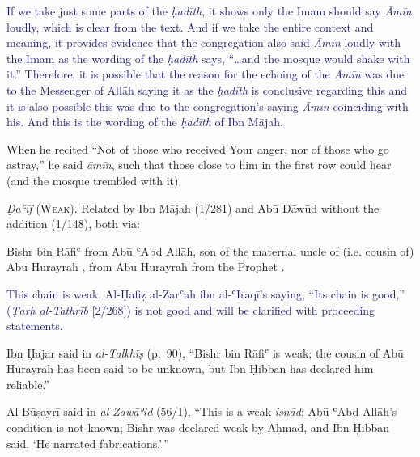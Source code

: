 \textcolor{MidnightBlue}{If we take just some parts of the \emph{ḥadīth}, it shows only the Imam
should say \emph{Āmīn} loudly, which is clear from the text. And if we
take the entire context and meaning, it provides evidence that the
congregation also said \emph{Āmīn} loudly with the Imam as the wording
of the \emph{ḥadīth} says, ``\ldots{}and the mosque would shake with
it.'' Therefore, it is possible that the reason for the echoing of the
\emph{Āmīn} was due to the Messenger of Allāh \pbuh saying it as the
\emph{ḥadīth} is conclusive regarding this and it is also possible this
was due to the congregation's saying \emph{Āmīn} coinciding with his.
And this is the wording of the \emph{ḥadīth} of Ibn Mājah.}

\begin{mdframed}[style=narration, frametitle={Narration \#952}]
When he recited “Not of those who received Your anger, nor of those who go astray,” he said \textit{āmīn}, such that those close to him in the first row could hear (and the mosque trembled with it).
\end{mdframed}

\emph{Ḍaʿīf} (\textsc{Weak}). Related by Ibn Mājah (1/281) and Abū Dāwūd
without the addition (1/148), both via:

Bishr bin Rāfiʿ from Abū ʿAbd Allāh, son of the maternal uncle of (i.e. cousin of) Abū Hurayrah \mabpwhim,
from Abū Hurayrah \mabpwhim from the Prophet \pbuh.

\textcolor{MidnightBlue}{This chain is weak. Al-Ḥafiẓ
al-Zarʿah ibn al-ʿIraqī's saying, “Its chain is good,” (\textit{Ṭarḥ al-Tathrīb} [2/268]) is not good and will be clarified with proceeding statements.}

Ibn Ḥajar said in \emph{al-Talkhīṣ} (p.~90), ``Bishr bin Rāfiʿ is weak;
the cousin of Abū Hurayrah \mabpwhim has been said to be unknown, but
Ibn Ḥibbān has declared him reliable.''

Al-Būṣayrī said in \emph{al-Zawāʾid} (56/1), ``This is a weak
\emph{isnād}; Abū ʿAbd Allāh's condition is not known; Bishr was
declared weak by Aḥmad, and Ibn Ḥibbān said, `He narrated
fabrications.'\,''

